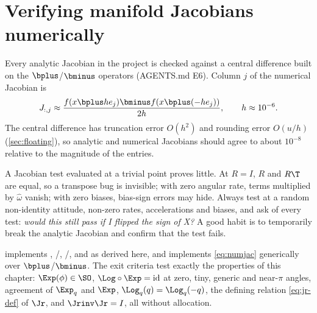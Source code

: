 \section{Verifying manifold Jacobians numerically}
\label{sec:numjac}

Every analytic Jacobian in the project is checked against a central difference built on the
$\bplus$/$\bminus$ operators (AGENTS.md E6). Column $j$ of the numerical Jacobian is
\begin{equation}
  J_{:,j} \approx \frac{ f(x\bplus h e_j) \bminus f(x\bplus(-h e_j)) }{2h},
  \qquad h \approx 10^{-6}.
  \label{eq:numjac}
\end{equation}
The central difference has truncation error $O(h^2)$ and rounding error $O(u/h)$
(\cref{sec:floating}), so analytic and numerical Jacobians should agree to about $10^{-8}$ relative
to the magnitude of the entries.

\begin{pitfall}
A Jacobian test evaluated at a trivial point proves little. At $R = I$, $R$ and $R\T$ are equal, so a
transpose bug is invisible; with zero angular rate, terms multiplied by $\hat\omega$ vanish; with zero
biases, bias-sign errors may hide. Always test at a random non-identity attitude, non-zero rates,
accelerations and biases, and ask of every test: \emph{would this still pass if I flipped the sign of
X?} A good habit is to temporarily break the analytic Jacobian and confirm that the test fails.
\end{pitfall}

\begin{projectlink}[Milestone 2]
 implements , /, /,  and
 as derived here, and  implements \eqref{eq:numjac} generically
over $\bplus$/$\bminus$. The exit criteria test exactly the properties of this chapter: $\Exp(\phi) \in \SO$,
$\Log\circ\Exp = \mathrm{id}$ at zero, tiny, generic and near-$\pi$ angles, agreement of $\Exp_q$ and $\Exp$,
$\Log_q(q) = \Log_q(-q)$, the defining relation \eqref{eq:jr-def} of $\Jr$, and $\Jrinv\Jr = I$, all
without allocation.
\end{projectlink}

